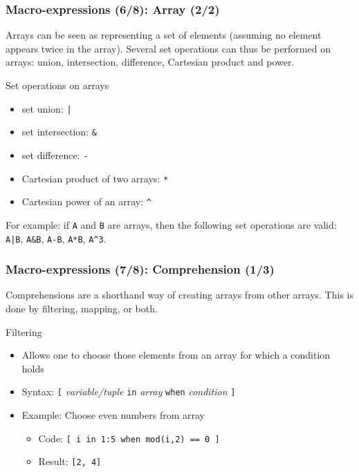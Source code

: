 \documentclass[aspectratio=169]{beamer}
\begin{document}
\begin{frame}[fragile=singleslide]
  \frametitle{Macro-expressions (6/8): Array (2/2)}
  Arrays can be seen as representing a set of elements (assuming no element
  appears twice in the array). Several set operations can thus be performed on
  arrays: union, intersection, difference, Cartesian product and power.
  \begin{block}{Set operations on arrays}
    \begin{itemize}
    \item set union: \texttt{|}
    \item set intersection: \texttt{\&}
    \item set difference: \texttt{-}
    \item Cartesian product of two arrays: \texttt{*}
    \item Cartesian power of an array: \texttt{\^}
    \end{itemize}
  \end{block}
  For example: if \texttt{A} and \texttt{B} are arrays, then the following
  set operations are valid: \texttt{A|B}, \texttt{A\&B}, \texttt{A-B},
  \texttt{A*B}, \texttt{A\^{}3}.
\end{frame}

\begin{frame}[fragile=singleslide]
  \frametitle{Macro-expressions (7/8): Comprehension (1/3)}
  Comprehensions are a shorthand way of creating arrays from other arrays. This is done by filtering, mapping, or both.
  \begin{block}{Filtering}
    \begin{itemize}
    \item Allows one to choose those elements from an array for which a condition holds
    \item Syntax: \texttt{[} \textit{variable/tuple} \texttt{in} \textit{array} \texttt{when}
      \textit{condition} \texttt{]}
    \item Example: Choose even numbers from array
      \begin{itemize}
      \item Code: \texttt{[ i in 1:5 when mod(i,2) == 0 ]}
      \item Result: \texttt{[2, 4]}
      \end{itemize}
    \end{itemize}
  \end{block}
\end{frame}
\end{document}
